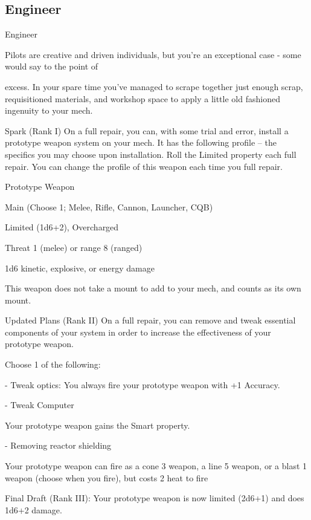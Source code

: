 \subsection{Engineer}

                                                   Engineer  

Pilots are creative and driven individuals, but you’re an exceptional case - some would say to the point of  

excess. In your spare time you’ve managed to scrape together just enough scrap, requisitioned materials,  
and workshop space to apply a little old fashioned ingenuity to your mech.  

Spark (Rank I)  
On a full repair, you can, with some trial and error, install a prototype weapon system on your  
mech. It has the following profile -- the specifics you may choose upon installation. Roll the  
Limited property each full repair. You can change the profile of this weapon each time you full  
repair.
 
         Prototype Weapon
 
         Main (Choose 1; Melee, Rifle, Cannon, Launcher, CQB)
 
         Limited (1d6+2), Overcharged
 
         Threat 1 (melee) or range 8 (ranged)
 
         1d6 kinetic, explosive, or energy damage
 
This weapon does not take a mount to add to your mech, and counts as its own mount.
 
Updated Plans  (Rank II)  
On a full repair, you can remove and tweak essential components of your system in order to  
increase the effectiveness of your prototype weapon.
 
Choose 1 of the following:
 
  - Tweak optics:  
         You always fire your prototype weapon with +1 Accuracy. 
 
  - Tweak Computer
 

                                                                                                                 


         Your prototype weapon gains the Smart property. 
 
  - Removing reactor shielding
 
         Your prototype weapon can fire as a cone 3 weapon, a line 5 weapon, or a blast 1  
         weapon (choose when you fire), but costs 2 heat to fire
 
Final Draft (Rank III): Your prototype weapon is now limited (2d6+1) and does 1d6+2 damage.
 